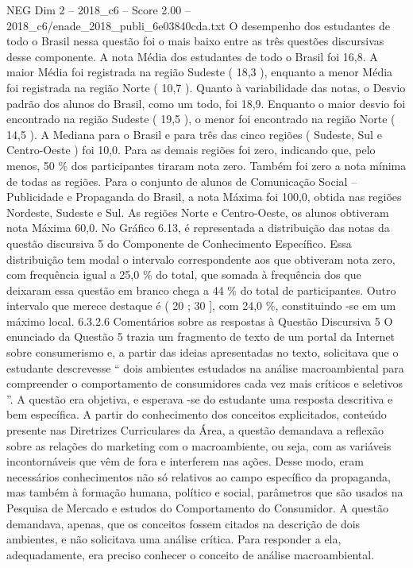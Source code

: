 \begin{textsample}{NEG Dim 2 – 2018\_c6 – Score 2.00 – 2018\_c6/enade\_2018\_publi\_6e03840cda.txt}
O desempenho dos estudantes de todo o Brasil nessa questão foi o mais baixo entre as três questões discursivas desse componente.
A nota Média dos estudantes de todo o Brasil foi 16,8.
A maior Média foi registrada na região Sudeste ( 18,3 ), enquanto a menor Média foi registrada na região Norte ( 10,7 ).
Quanto à variabilidade das notas, o Desvio padrão dos alunos do Brasil, como um todo, foi 18,9.
Enquanto o maior desvio foi encontrado na região Sudeste ( 19,5 ), o menor foi encontrado na região Norte ( 14,5 ).
A Mediana para o Brasil e para três das cinco regiões ( Sudeste, Sul e Centro-Oeste ) foi 10,0.
Para as demais regiões foi zero, indicando que, pelo menos, 50 \% dos participantes tiraram nota zero.
Também foi zero a nota mínima de todas as regiões.
Para o conjunto de alunos de Comunicação Social – Publicidade e Propaganda do Brasil, a nota Máxima foi 100,0, obtida nas regiões Nordeste, Sudeste e Sul.
As regiões Norte e Centro-Oeste, os alunos obtiveram nota Máxima 60,0.
No Gráfico 6.13, é representada a distribuição das notas da questão discursiva 5 do Componente de Conhecimento Específico.
Essa distribuição tem modal o intervalo correspondente aos que obtiveram nota zero, com frequência igual a 25,0 \% do total, que somada à frequência dos que deixaram essa questão em branco chega a 44 \% do total de participantes.
Outro intervalo que merece destaque é ( 20 ; 30 ], com 24,0 \%, constituindo -se em um máximo local. 6.3.2.6 Comentários sobre as respostas à Questão Discursiva 5 O enunciado da Questão 5 trazia um fragmento de texto de um portal da Internet sobre consumerismo e, a partir das ideias apresentadas no texto, solicitava que o estudante descrevesse “ dois ambientes estudados na análise macroambiental para compreender o comportamento de consumidores cada vez mais críticos e seletivos ”.
A questão era objetiva, e esperava -se do estudante uma resposta descritiva e bem específica.
A partir do conhecimento dos conceitos explicitados, conteúdo presente nas Diretrizes Curriculares da Área, a questão demandava a reflexão sobre as relações do marketing com o macroambiente, ou seja, com as variáveis incontornáveis que vêm de fora e interferem nas ações.
Desse modo, eram necessários conhecimentos não só relativos ao campo específico da propaganda, mas também à formação humana, político e social, parâmetros que são usados na Pesquisa de Mercado e estudos do Comportamento do Consumidor.
A questão demandava, apenas, que os conceitos fossem citados na descrição de dois ambientes, e não solicitava uma análise crítica.
Para responder a ela, adequadamente, era preciso conhecer o conceito de análise macroambiental.

\end{textsample}
